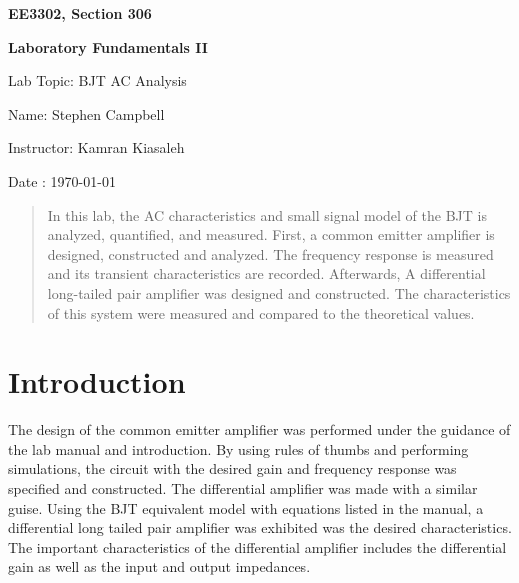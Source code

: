 \documentclass{article}
\begin{document}
\begin{titlepage}
  \begin{center}
  \vspace*{1in}    
  \Huge
  \textbf{EE3302, Section 306}

  \textbf{Laboratory Fundamentals II}
  \vspace*{0.25in}    

  \Large
  Lab Topic: BJT AC Analysis

  Name: Stephen Campbell

  Instructor: Kamran Kiasaleh

  Date : \today

  \end{center}
\end{titlepage}
\begin{abstract}
 In this lab, the AC characteristics and small signal model of the BJT is analyzed,
 quantified, and measured. First, a common emitter amplifier is designed, constructed
 and analyzed. The frequency response is measured and its transient characteristics 
 are recorded. Afterwards, A differential long-tailed pair amplifier was designed
 and constructed. The characteristics of this system were measured and compared to 
 the theoretical values.
\end{abstract}
\section*{Introduction}
The design of the common emitter amplifier was performed under the guidance of
the lab manual and introduction. By using rules of thumbs and performing simulations,
the circuit with the desired gain and frequency response was specified and constructed.
The differential amplifier was made with a similar guise. Using the BJT equivalent model 
with equations listed in the manual, a differential long tailed pair amplifier was
exhibited was the desired characteristics. The important characteristics of 
the differential amplifier includes the differential gain as well as the input and 
output impedances.
\end{document}
